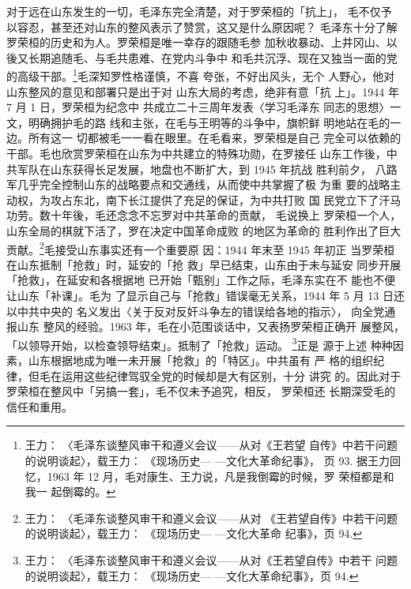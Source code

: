 对于远在山东发生的一切，毛泽东完全清楚，对于罗荣桓的「抗上」， 毛不仅予
以容忍，甚至还对山东的整风表示了赞赏，这又是什么原因呢？ 毛泽东十分了解
罗荣桓的历史和为人。罗荣桓是唯一幸存的跟随毛参 加秋收暴动、上井冈山、以
後又长期追随毛、与毛共患难、在党内斗争中 和毛共沉浮、现在又独当一面的党
的高级干部。\footnote{王力： 〈毛泽东谈整风审干和遵义会议——从对《王若望
自传》中若干问题的说明谈起〉，载王力： 《现场历史— —文化大革命纪事》，
页 93. 据王力回忆，1963 年 12 月，毛对康生、王力说，凡是我倒霉的时候，罗
荣桓都是和我一 起倒霉的。}毛深知罗性格谨慎，不喜 夸张，不好出风头，无个
人野心，他对山东整风的意见和部署只是出于对 山东大局的考虑，绝非有意「抗
上」。1944 年 7 月 1 日，罗荣桓为纪念中 共成立二十三周年发表〈学习毛泽东
同志的思想〉一文，明确拥护毛的路 线和主张，在毛与王明等的斗争中，旗帜鲜
明地站在毛的一边。所有这一 切都被毛一一看在眼里。在毛看来，罗荣桓是自己
完全可以依赖的干部。毛也欣赏罗荣桓在山东为中共建立的特殊功勋，在罗接任
山东工作後，中 共军队在山东获得长足发展，地盘也不断扩大，到 1945 年抗战
胜利前夕， 八路军几乎完全控制山东的战略要点和交通线，从而使中共掌握了极
为重 要的战略主动权，为攻占东北，南下长江提供了充足的保证，为中共打败 国
民党立下了汗马功劳。数十年後，毛还念念不忘罗对中共革命的贡献， 毛说换上
罗荣桓一个人，山东全局的棋就下活了，罗在决定中国革命成败 的地区为革命的
胜利作出了巨大贡献。\footnote{王力： 〈毛泽东谈整风审干和遵义会议——从对
《王若望自传》中若干问题的说明谈起〉，载王力： 《现场历史— —文化大革命
纪事》，页 94.}毛接受山东事实还有一个重要原 因：1944 年末至 1945 年初正
当罗荣桓在山东抵制「抢救」时，延安的「抢 救」早已结束，山东由于未与延安
同步开展「抢救」，在延安和各根据地 已开始「甄别」工作之际，毛泽东实在不
能也不便让山东「补课」。毛为 了显示自己与「抢救」错误毫无关系，1944 年 5
月 13 日还以中共中央的 名义发出〈关于反对反奸斗争左的错误给各地的指示〉，
向全党通报山东 整风的经验。1963 年，毛在小范围谈话中，又表扬罗荣桓正确开
展整风， 「以领导开始，以检查领导结束」。抵制了「抢救」运动。
\footnote{王力： 〈毛泽东谈整风审干和遵义会议——从对《王若望自传》中若干
问题的说明谈起〉，载王力： 《现场历史— —文化大革命纪事》，页 94.}正是
源于上述 种种因素，山东根据地成为唯一未开展「抢救」的「特区」。中共虽有
严 格的组织纪律，但毛在运用这些纪律驾驭全党的时候却是大有区别，十分 讲究
的。因此对于罗荣桓在整风中「另搞一套」，毛不仅未予追究，相反， 罗荣桓还
长期深受毛的信任和重用。
